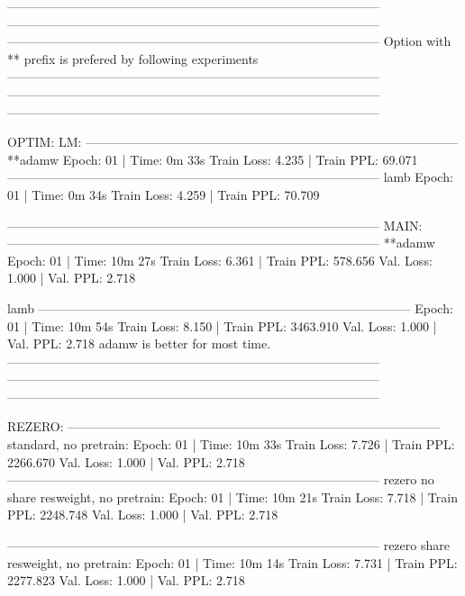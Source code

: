 \documentclass[letterpaper]{article} %
\begin{document}
\begin{CJK*}{UTF8}{gbsn}
-----------------------------------------------------------------------------------------
-----------------------------------------------------------------------------------------
-----------------------------------------------------------------------------------------
Option with ** prefix is prefered by following experiments
-----------------------------------------------------------------------------------------
-----------------------------------------------------------------------------------------
-----------------------------------------------------------------------------------------

OPTIM:
LM:
-----------------------------------------------------------------------------------------
**adamw
 Epoch: 01 | Time: 0m 33s
	Train Loss: 4.235 | Train PPL:  69.071
-----------------------------------------------------------------------------------------
lamb
 Epoch: 01 | Time: 0m 34s
	Train Loss: 4.259 | Train PPL:  70.709

-----------------------------------------------------------------------------------------
MAIN:
-----------------------------------------------------------------------------------------
**adamw
Epoch: 01 | Time: 10m 27s
    Train Loss: 6.361 | Train PPL: 578.656
         Val. Loss: 1.000 |  Val. PPL:   2.718

lamb
-----------------------------------------------------------------------------------------
Epoch: 01 | Time: 10m 54s
	Train Loss: 8.150 | Train PPL: 3463.910
	 Val. Loss: 1.000 |  Val. PPL:   2.718
adamw is better for most time.
-----------------------------------------------------------------------------------------
-----------------------------------------------------------------------------------------
-----------------------------------------------------------------------------------------

REZERO:
-----------------------------------------------------------------------------------------
standard, no pretrain:
Epoch: 01 | Time: 10m 33s
	Train Loss: 7.726 | Train PPL: 2266.670
	 Val. Loss: 1.000 |  Val. PPL:   2.718
-----------------------------------------------------------------------------------------
rezero no share resweight, no pretrain:
Epoch: 01 | Time: 10m 21s
	Train Loss: 7.718 | Train PPL: 2248.748
	 Val. Loss: 1.000 |  Val. PPL:   2.718

-----------------------------------------------------------------------------------------
rezero share resweight, no pretrain:
Epoch: 01 | Time: 10m 14s
	Train Loss: 7.731 | Train PPL: 2277.823
	 Val. Loss: 1.000 |  Val. PPL:   2.718


\end{CJK*}
\end{document}
